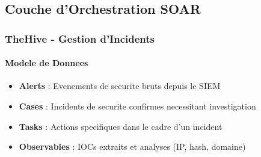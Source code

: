 \subsection{Couche d'Orchestration SOAR}

\subsubsection{TheHive - Gestion d'Incidents}

\paragraph{Modele de Donnees}
\begin{itemize}
    \item \textbf{Alerts} : Evenements de securite bruts depuis le SIEM
    \item \textbf{Cases} : Incidents de securite confirmes necessitant investigation
    \item \textbf{Tasks} : Actions specifiques dans le cadre d'un incident
    \item \textbf{Observables} : IOCs extraits et analyses (IP, hash, domaine)
\end{itemize}

